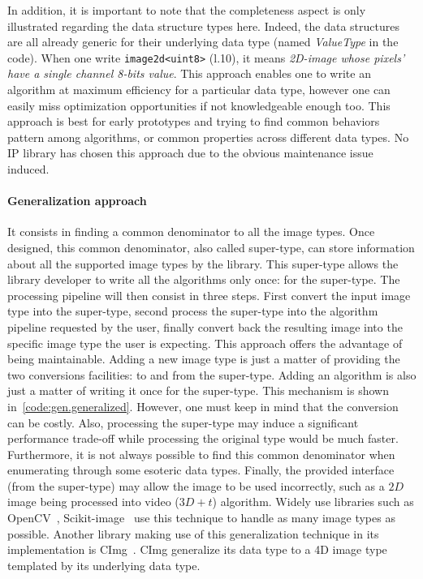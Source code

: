 In addition, it is important to note that the completeness aspect is only illustrated regarding the data structure types
here. Indeed, the data structures are all already generic for their underlying data type (named \emph{ValueType} in the
code). When one write \texttt{image2d<uint8>} (l.10), it means \emph{2D-image whose pixels' have a single channel 8-bits
  value}. This approach enables one to write an algorithm at maximum efficiency for a particular data type, however one
can easily miss optimization opportunities if not knowledgeable enough too. This approach is best for early prototypes
and trying to find common behaviors pattern among algorithms, or common properties across different data types. No IP
library has chosen this approach due to the obvious maintenance issue induced.

\paragraph{Generalization approach} It consists in finding a common denominator to all the image types. Once designed,
this common denominator, also called super-type, can store information about all the supported image types by the
library. This super-type allows the library developer to write all the algorithms only once: for the super-type. The
processing pipeline will then consist in three steps. First convert the input image type into the super-type, second
process the super-type into the algorithm pipeline requested by the user, finally convert back the resulting image into
the specific image type the user is expecting. This approach offers the advantage of being maintainable. Adding a new
image type is just a matter of providing the two conversions facilities: to and from the super-type. Adding an algorithm
is also just a matter of writing it once for the super-type. This mechanism is shown in~\cref{code:gen.generalized}.
However, one must keep in mind that the conversion can be costly. Also, processing the super-type may induce a
significant performance trade-off while processing the original type would be much faster. Furthermore, it is not always
possible to find this common denominator when enumerating through some esoteric data types. Finally, the provided
interface (from the super-type) may allow the image to be used incorrectly, such as a \(2D\) image being processed into
video (\(3D+t\)) algorithm. Widely use libraries such as OpenCV~\parencite{bradski.2000.opencv},
Scikit-image~\parencite{vanderwalt.2014.skimage} use this technique to handle as many image types as possible. Another
library making use of this generalization technique in its implementation is CImg~\parencite{tschumperle.2012.cimg}.
CImg generalize its data type to a 4D image type templated by its underlying data type.

